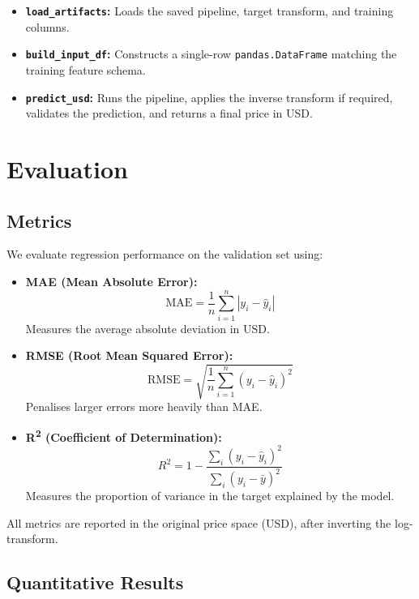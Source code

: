 \documentclass[11pt,a4paper]{article}
\begin{document}
\begin{itemize}[leftmargin=*]
    \item \textbf{\texttt{load\_artifacts}:} Loads the saved pipeline, target transform, and training columns.
    \item \textbf{\texttt{build\_input\_df}:} Constructs a single-row \texttt{pandas.DataFrame} matching the training feature schema.
    \item \textbf{\texttt{predict\_usd}:} Runs the pipeline, applies the inverse transform if required, validates the prediction, and returns a final price in USD.
\end{itemize}

\section{Evaluation}

\subsection{Metrics}

We evaluate regression performance on the validation set using:

\begin{itemize}[leftmargin=*]
    \item \textbf{MAE (Mean Absolute Error):}
    \[
    \text{MAE} = \frac{1}{n} \sum_{i=1}^n \left| y_i - \hat{y}_i \right|
    \]
    Measures the average absolute deviation in USD.
    \item \textbf{RMSE (Root Mean Squared Error):}
    \[
    \text{RMSE} = \sqrt{\frac{1}{n} \sum_{i=1}^n \left( y_i - \hat{y}_i \right)^2}
    \]
    Penalises larger errors more heavily than MAE.
    \item \textbf{R\textsuperscript{2} (Coefficient of Determination):}
    \[
    R^2 = 1 - \frac{\sum_i (y_i - \hat{y}_i)^2}{\sum_i (y_i - \bar{y})^2}
    \]
    Measures the proportion of variance in the target explained by the model.
\end{itemize}

All metrics are reported in the original price space (USD), after inverting the log-transform.

\subsection{Quantitative Results}
\end{document}

